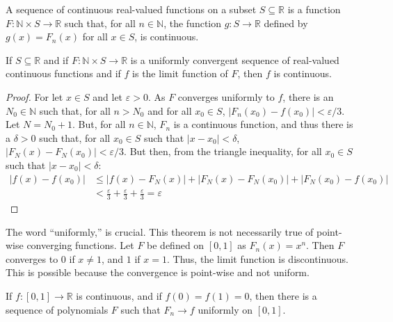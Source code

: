     \begin{definition}
        A sequence of continuous real-valued functions
        on a subset $S\subseteq\mathbb{R}$ is a
        function
        $F:\mathbb{N}\times{S}\rightarrow\mathbb{R}$
        such that, for all $n\in\mathbb{N}$, the function
        $g:S\rightarrow\mathbb{R}$ defined by
        $g(x)=F_{n}(x)$ for all $x\in{S}$,
        is continuous.
    \end{definition}
    \begin{theorem}
        If $S\subseteq\mathbb{R}$ and if
        $F:\mathbb{N}\times{S}\rightarrow\mathbb{R}$
        is a uniformly convergent sequence of
        real-valued continuous functions and if
        ${f}$ is the limit function of $F$, then
        $f$ is continuous.
    \end{theorem}
    \begin{proof}
        For let $x\in{S}$ and let
        $\varepsilon>0$. As $F$ converges
        uniformly to $f$, there is an
        $N_{0}\in\mathbb{N}$ such that, for all
        $n>N_{0}$ and for all $x_{0}\in{S}$,
        $|F_{n}(x_{0})-f(x_{0})|<\varepsilon/3$.
        Let $N=N_{0}+1$.
        But, for all $n\in\mathbb{N}$,
        $F_{n}$ is a continuous function, and
        thus there is a $\delta>0$ such that,
        for all $x_{0}\in{S}$ such that
        $|x-x_{0}|<\delta$,
        $|F_{N}(x)-F_{N}(x_{0})|<\varepsilon/3$.
        But then, from the triangle inequality,
        for all $x_{0}\in{S}$ such that
        $|x-x_{0}|<\delta$:
        \begin{align}
            \nonumber
            |f(x)-f(x_{0})|&\leq
            |f(x)-F_{N}(x)|
            +|F_{N}(x)-F_{N}(x_{0})|
            +|F_{N}(x_{0})-f(x_{0})|\\
            &<\frac{\varepsilon}{3}+
            \frac{\varepsilon}{3}+
            \frac{\varepsilon}{3}
            =\varepsilon
        \end{align}
    \end{proof}
    The word ``uniformly,'' is crucial.
    This theorem is not necessarily true of
    point-wise converging functions. Let $F$ be
    defined on $[0,1]$ as
    $F_{n}(x)=x^{n}$. Then $F$ converges to
    $0$ if $x\ne{1}$, and $1$ if $x=1$. Thus,
    the limit function is discontinuous. This is
    possible because the convergence is
    point-wise and not uniform.
    \begin{theorem}
            \label{thm:funct:Weak_Weierstrass_%
                   Approx_Theorem}
            If $f:[0,1]\rightarrow\mathbb{R}$
            is continuous,
            and if $f(0)=f(1)=0$,
            then there is a sequence of polynomials
            $F$ such that $F_{n}\rightarrow{f}$
            uniformly on $[0,1]$.
        \end{theorem}
